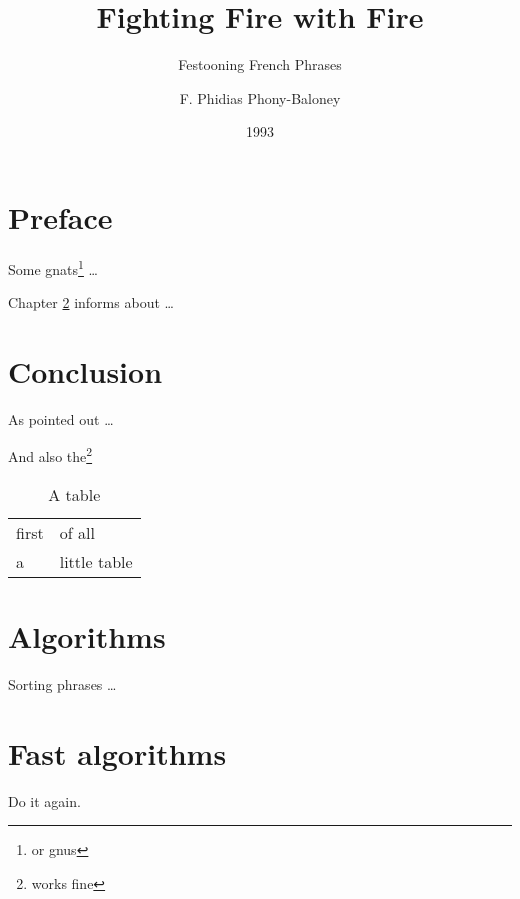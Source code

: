 \documentclass[12pt,nocenter,upper,crosshair,sfbold,chapterbib]{thema}
\begin{document}
\frontmatter
\title{Fighting Fire with Fire}
\subtitle{Festooning French Phrases}
\author{F. Phidias Phony-Baloney}
\dedication{\em --- Jules and Jim ---}
\uppertitleback{Fanstord University Press}
\lowertitleback{Copyright $\copyright$ 1993 Phoney-Baloney}
\date{1993}

\maketitle

\tableofcontents 

\chapter{Preface}

Some gnats\footnote{or gnus} \dots

Chapter \ref{Chap:Conclusion} informs about \dots

\mainmatter

\chapter{Conclusion}
\label{Chap:Conclusion}


\begin{chapterabstract}
As pointed out \dots 
\end{chapterabstract}

And also the\footnote{works fine}


\begin{table}[htbp]
  \begin{center}
    \leavevmode
    \begin{tabular}{ll}
      first & of all       \\
      a     & little table \\
    \end{tabular}
    \caption{A table}
    \label{tab:mytab}
  \end{center}
\end{table}


\appendix

\chapter{Algorithms}

Sorting phrases \dots 

\chapter{Fast algorithms}

Do it again.
\end{document}
